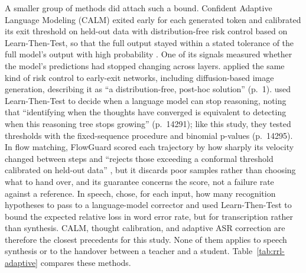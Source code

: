 A smaller group of methods did attach such a bound. Confident Adaptive Language Modeling (CALM) exited early for each generated token and calibrated its exit threshold on held-out data with distribution-free risk control based on Learn-Then-Test, so that the full output stayed within a stated tolerance of the full model's output with high probability \parencite{schuster2022calm}. One of its signals measured whether the model's predictions had stopped changing across layers. \textcite{jazbec2024fast} applied the same kind of risk control to early-exit networks, including diffusion-based image generation, describing it as \enquote{a distribution-free, post-hoc solution} (p.~1). \textcite{wu2025thought} used Learn-Then-Test to decide when a language model can stop reasoning, noting that \enquote{identifying when the thoughts have converged is equivalent to detecting when this reasoning tree stops growing} (p.~14291); like this study, they tested thresholds with the fixed-sequence procedure and binomial p-values (p.~14295). In flow matching, FlowGuard scored each trajectory by how sharply its velocity changed between steps and \enquote{rejects those exceeding a conformal threshold calibrated on held-out data} \parencite[p.~1]{li2025flowguard}, but it discards poor samples rather than choosing what to hand over, and its guarantee concerns the score, not a failure rate against a reference. In speech, \textcite{damri2026confident} chose, for each input, how many recognition hypotheses to pass to a language-model corrector and used Learn-Then-Test to bound the expected relative loss in word error rate, but for transcription rather than synthesis. CALM, thought calibration, and adaptive ASR correction are therefore the closest precedents for this study. None of them applies to speech synthesis or to the handover between a teacher and a student. Table~\ref{tab:rrl-adaptive} compares these methods.

